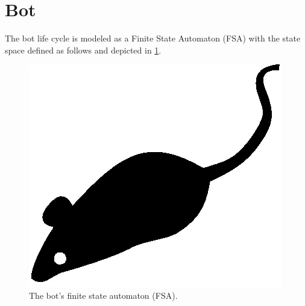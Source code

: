 \section{Bot}
\label{sec:bot}

The bot life cycle is modeled as a Finite State Automaton (FSA) with the state space defined as follows and depicted in \ref{fig:bot-fsa}.

\begin{figure}[tp]
  \centering
  \includegraphics{./fig/acmlarge-mouse}
  \caption{The bot's finite state automaton (FSA).}
    \label{fig:bot-fsa}
\end{figure}

